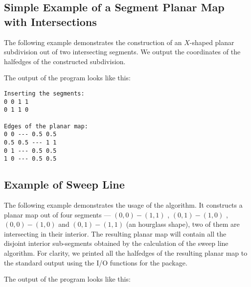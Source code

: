 
\subsection{Simple Example of a Segment Planar Map with Intersections}
\label{ssec:example1}
The following example demonstrates the construction of an
$X$-shaped planar subdivision out of two intersecting segments.
We output the coordinates of the halfedges of the constructed
subdivision.


The output of the program looks like this:
\begin{verbatim}
Inserting the segments:
0 0 1 1
0 1 1 0

Edges of the planar map:
0 0 --- 0.5 0.5
0.5 0.5 --- 1 1
0 1 --- 0.5 0.5
1 0 --- 0.5 0.5
\end{verbatim}


\subsection{Example of Sweep Line}
\label{ssec:example1_sweep}
  The following example demonstrates the usage of the  algorithm.  It constructs a planar map out of four segments
  --- $(0,0)-(1,1)$ , $(0,1)-(1,0)$ , $(0,0)-(1,0)$ and $(0,1)-(1,1)$
  (an hourglass shape), two of them are intersecting in their
  interior.  The resulting planar map will contain all the disjoint
  interior sub-segments obtained by the calculation of the sweep
  line algorithm. For clarity, we printed all the halfedges of the
  resulting planar map to the standard output using the I/O functions
  for the  package.


The output of the program looks like this:




